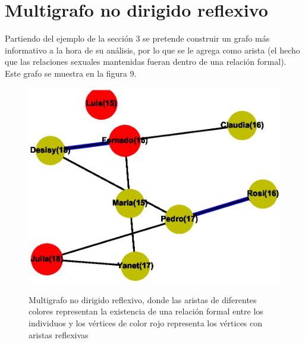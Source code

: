 \documentclass{article}
\begin{document}
\section{Multigrafo no dirigido reflexivo}
Partiendo del ejemplo de la sección 3 se pretende construir un grafo más informativo a la hora de su análisis, por lo que se le agrega como arista (el hecho que las relaciones sexuales mantenidas fueran dentro de una relación formal). Este grafo se muestra en la figura 9.
\begin{center}

\end{center}
\begin{figure}[h]
\begin{center}
\includegraphics[scale=0.7]{Graf9.eps}\\
\caption{Multigrafo no dirigido reflexivo, donde las aristas de diferentes colores representan la existencia de una relación formal entre los individuos y los vértices de color rojo representa los vértices con aristas reflexivas}
\end{center}
\end{figure}
\end{document}
